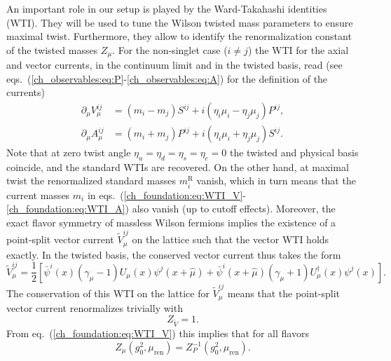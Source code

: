 An important role in our setup is played by the Ward-Takahashi identities (WTI). They will be used to tune the Wilson twisted mass parameters to ensure maximal twist. Furthermore, they allow to identify the renormalization constant of the twisted masses $Z_{\mu}$. For the non-singlet case ($i\neq j$) the WTI for the axial and vector currents, in the continuum limit and in the twisted basis, read (see eqs.~(\ref{ch_observables:eq:P}-\ref{ch_observables:eq:A}) for the definition of the currents)
\begin{align}
\label{ch_foundation:eq:WTI_V}
\partial_{\mu}V_{\mu}^{ij}&=(m_i-m_j)S^{ij}+i(\eta_i\mu_i-\eta_j\mu_j)P^{ij},\\
\label{ch_foundation:eq:WTI_A}
\partial_{\mu}A_{\mu}^{ij}&=(m_i+m_j)P^{ij}+i(\eta_i\mu_i+\eta_j\mu_j)S^{ij}.
\end{align}
Note that at zero twist angle $\eta_u=\eta_d=\eta_s=\eta_c=0$ the twisted and physical basis coincide, and the standard WTIs are recovered. On the other hand, at maximal twist the renormalized standard masses $m_i^{\textrm{R}}$ vanish, which in turn means that the current masses $m_{i}$ in eqs.~(\ref{ch_foundation:eq:WTI_V}-\ref{ch_foundation:eq:WTI_A}) also vanish (up to cutoff effects). Moreover, the exact flavor symmetry of massless Wilson fermions implies the existence of a point-split vector current $\tilde{V}_{\mu}^{ij}$ on the lattice such that the vector WTI holds exactly. In the twisted basis, the conserved vector current thus takes the form
\begin{equation}
\tilde{V}_{\mu}^{ij}=\frac{1}{2}\left[\bar{\psi}^i(x)(\gamma_{\mu}-1)U_{\mu}(x)\psi^j(x+\hat{\mu})+\bar{\psi}^i(x+\hat{\mu})(\gamma_{\mu}+1)U_{\mu}^{\dagger}(x)\psi^j(x)\right].
\end{equation}
The conservation of this WTI on the lattice for $\tilde{V}_{\mu}^{ij}$ means that the point-split vector current renormalizes trivially with
\begin{equation}
\label{ch_foundation:eq:ZV=1}
Z_{\tilde{V}}=1.
\end{equation}
From eq.~(\ref{ch_foundation:eq:WTI_V}) this implies that for all flavors
\begin{equation}
\label{ch_foundation:eq:Zmu}
Z_{\mu}(g_0^2,\mu_{\textrm{ren}})=Z_P^{-1}(g_0^2,\mu_{\textrm{ren}}).
\end{equation}



